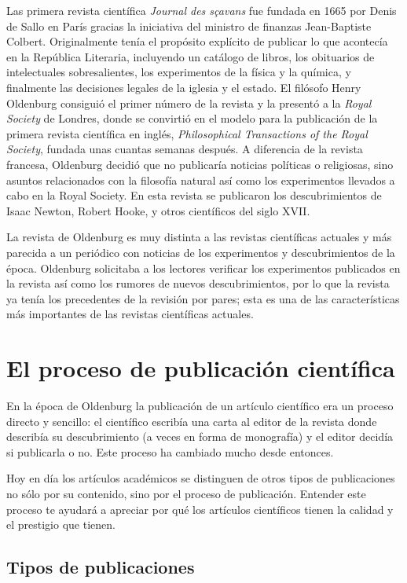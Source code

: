 Las primera revista científica \emph{Journal des sçavans} fue fundada en 1665 por Denis de Sallo en París gracias la iniciativa del ministro de finanzas Jean-Baptiste Colbert.
Originalmente tenía el propósito explícito de publicar lo que acontecía en la República Literaria, incluyendo un catálogo de libros, los obituarios de intelectuales sobresalientes, los experimentos de la física y la química, y finalmente las decisiones legales de la iglesia y el estado\cite{Fyfe2022-ca}.
El filósofo Henry Oldenburg consiguió el primer número de la revista y la presentó a la \emph{Royal Society} de Londres, donde se convirtió en el modelo para la publicación de la primera revista científica en inglés, \emph{Philosophical Transactions of the Royal Society}, fundada unas cuantas semanas después.
A diferencia de la revista francesa, Oldenburg decidió que no publicaría noticias políticas o religiosas, sino asuntos relacionados con la filosofía natural así como los experimentos llevados a cabo en la Royal Society.
En esta revista se publicaron los descubrimientos de Isaac Newton, Robert Hooke, y otros científicos del siglo XVII.

La revista de Oldenburg es muy distinta a las revistas científicas actuales y más parecida a un periódico con noticias de los experimentos y descubrimientos de la época.
Oldenburg solicitaba a los lectores verificar los experimentos publicados en la revista así como los rumores de nuevos descubrimientos, por lo que la revista ya tenía los precedentes de la revisión por pares; esta es una de las características más importantes de las revistas científicas actuales.

\section{El proceso de publicación científica}
\label{sec:procesopublicacion}
En la época de Oldenburg la publicación de un artículo científico era un proceso directo y sencillo: el científico escribía una carta al editor de la revista donde describía su descubrimiento (a veces en forma de monografía) y el editor decidía si publicarla o no.
Este proceso ha cambiado mucho desde entonces.

Hoy en día los artículos académicos se distinguen de otros tipos de publicaciones no sólo por su contenido, sino por el proceso de publicación.
Entender este proceso te ayudará a apreciar por qué los artículos científicos tienen la calidad y el prestigio que tienen.

\subsection*{Tipos de publicaciones}

